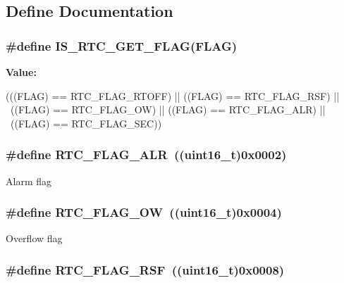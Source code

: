 \subsection{Define Documentation}
\hypertarget{group__RTC__interrupts__flags_ga2126725a0d48f1c40f42566e249620ef}{
\subsubsection[{IS\_\-RTC\_\-GET\_\-FLAG}]{\setlength{\rightskip}{0pt plus 5cm}\#define IS\_\-RTC\_\-GET\_\-FLAG(FLAG)}}
\label{group__RTC__interrupts__flags_ga2126725a0d48f1c40f42566e249620ef}
{\bfseries Value:}
\begin{DoxyCode}
(((FLAG) == RTC_FLAG_RTOFF) || ((FLAG) == RTC_FLAG_RSF) || \
                               ((FLAG) == RTC_FLAG_OW) || ((FLAG) == 
      RTC_FLAG_ALR) || \
                               ((FLAG) == RTC_FLAG_SEC))
\end{DoxyCode}
\hypertarget{group__RTC__interrupts__flags_gaed4375a7ea5a147f83c6cf4bfa805caf}{
\subsubsection[{RTC\_\-FLAG\_\-ALR}]{\setlength{\rightskip}{0pt plus 5cm}\#define RTC\_\-FLAG\_\-ALR~((uint16\_\-t)0x0002)}}
\label{group__RTC__interrupts__flags_gaed4375a7ea5a147f83c6cf4bfa805caf}
Alarm flag \hypertarget{group__RTC__interrupts__flags_ga4e321e359b914d7ed10eed985f8b4811}{
\subsubsection[{RTC\_\-FLAG\_\-OW}]{\setlength{\rightskip}{0pt plus 5cm}\#define RTC\_\-FLAG\_\-OW~((uint16\_\-t)0x0004)}}
\label{group__RTC__interrupts__flags_ga4e321e359b914d7ed10eed985f8b4811}
Overflow flag \hypertarget{group__RTC__interrupts__flags_ga78c4245996bef8d5f39226b6e37ed9c0}{
\subsubsection[{RTC\_\-FLAG\_\-RSF}]{\setlength{\rightskip}{0pt plus 5cm}\#define RTC\_\-FLAG\_\-RSF~((uint16\_\-t)0x0008)}}
